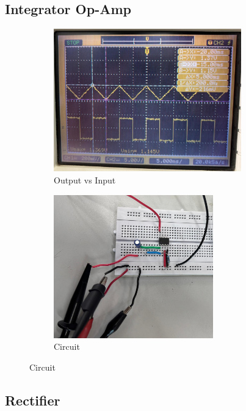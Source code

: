\documentclass[a4paper,12pt]{article}
\begin{document}
\subsection*{Integrator Op-Amp}
\begin{figure}[!h]
	\begin{subfigure}[b]{100pt}
		\caption{Output vs Input}
		\includegraphics[width = 230pt]{figs/int1.png}
	\end{subfigure}
	\hspace{110pt}
	\begin{subfigure}[b]{100pt}
		\caption{Circuit}
		\includegraphics[width = 196pt]{figs/int2.png}
	\end{subfigure}
\end{figure}
\subsection*{Rectifier}
\end{document}

